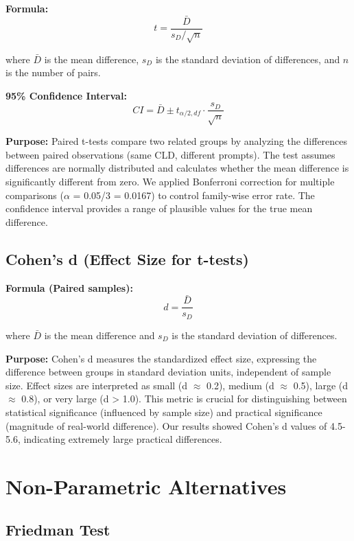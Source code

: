 \textbf{Formula:}
\begin{equation}
t = \frac{\bar{D}}{s_D / \sqrt{n}}
\end{equation}

where $\bar{D}$ is the mean difference, $s_D$ is the standard deviation of differences, and $n$ is the number of pairs.

\textbf{95\% Confidence Interval:}
\begin{equation}
CI = \bar{D} \pm t_{\alpha/2, df} \cdot \frac{s_D}{\sqrt{n}}
\end{equation}

\textbf{Purpose:} Paired t-tests compare two related groups by analyzing the differences between paired observations (same CLD, different prompts). The test assumes differences are normally distributed and calculates whether the mean difference is significantly different from zero. We applied Bonferroni correction for multiple comparisons ($\alpha$ = 0.05/3 = 0.0167) to control family-wise error rate. The confidence interval provides a range of plausible values for the true mean difference.

\subsection{Cohen's d (Effect Size for t-tests)}

\textbf{Formula (Paired samples):}
\begin{equation}
d = \frac{\bar{D}}{s_D}
\end{equation}

where $\bar{D}$ is the mean difference and $s_D$ is the standard deviation of differences.

\textbf{Purpose:} Cohen's d measures the standardized effect size, expressing the difference between groups in standard deviation units, independent of sample size. Effect sizes are interpreted as small (d $\approx$ 0.2), medium (d $\approx$ 0.5), large (d $\approx$ 0.8), or very large (d > 1.0). This metric is crucial for distinguishing between statistical significance (influenced by sample size) and practical significance (magnitude of real-world difference). Our results showed Cohen's d values of 4.5-5.6, indicating extremely large practical differences.

\section{Non-Parametric Alternatives}

\subsection{Friedman Test}

